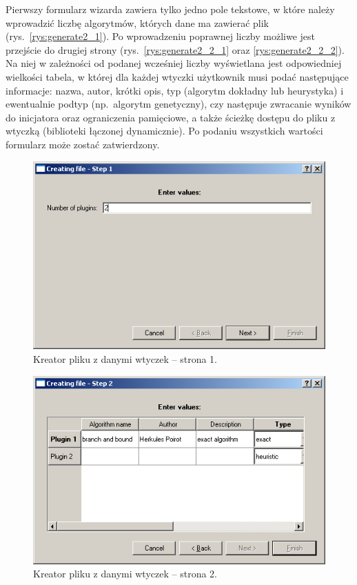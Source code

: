 Pierwszy formularz wizarda zawiera tylko jedno pole tekstowe, w które należy wprowadzić liczbę algorytmów, których dane ma zawierać plik 
(rys.~\vref{rys:generate2_1}). Po wprowadzeniu poprawnej liczby możliwe jest przejście do drugiej strony 
(rys.~\vref{rys:generate2_2_1} oraz \vref{rys:generate2_2_2}). Na niej w zależności od podanej wcześniej liczby wyświetlana jest odpowiedniej wielkości 
tabela, w której dla każdej wtyczki użytkownik musi podać następujące informacje: nazwa, autor, krótki opis, typ (algorytm dokładny lub heurystyka) 
i ewentualnie podtyp (np.~algorytm genetyczny), czy następuje zwracanie wyników do inicjatora oraz ograniczenia pamięciowe, a także ścieżkę dostępu 
do pliku z wtyczką (biblioteki łączonej dynamicznie). Po podaniu wszystkich wartości formularz może zostać zatwierdzony.

\begin{figure}[htp]
\centering\includegraphics[scale=0.7]{figures/screens/generate2_1.png}
\caption{Kreator pliku z danymi wtyczek -- strona 1.}\label{rys:generate2_1}
\end{figure}

\begin{figure}[htp]
\centering\includegraphics[scale=0.7]{figures/screens/generate2_2_1.png}
\caption{Kreator pliku z danymi wtyczek -- strona 2.}\label{rys:generate2_2_1}
\end{figure}


